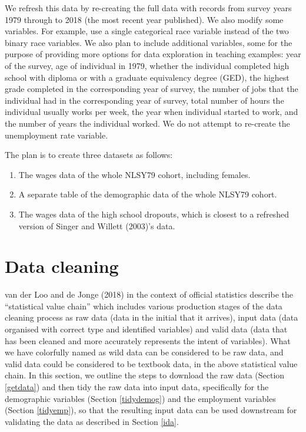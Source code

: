 \documentclass{article}
\begin{document}
We refresh this data by re-creating the full data with records from survey years 1979 through to 2018 (the most recent year published). We also modify some variables. For example, use a single categorical race variable instead of the two binary race variables. We also plan to include additional variables, some for the purpose of providing more options for data exploration in teaching examples: year of the survey, age of individual in 1979, whether the individual completed high school with diploma or with a graduate equivalency degree (GED), the highest grade completed in the corresponding year of survey, the number of jobs that the individual had in the corresponding year of survey, total number of hours the individual usually works per week, the year when individual started to work, and the number of years the individual worked. We do not attempt to re-create the unemployment rate variable.

The plan is to create three datasets as follows:

\begin{enumerate}
\def\labelenumi{\arabic{enumi}.}
\tightlist
\item
  The wages data of the whole NLSY79 cohort, including females.
\item
  A separate table of the demographic data of the whole NLSY79 cohort.
\item
  The wages data of the high school dropouts, which is closest to a refreshed version of Singer and Willett (2003)'s data.
\end{enumerate}

\hypertarget{cleaning}{%
\section{Data cleaning}\label{cleaning}}

van der Loo and de Jonge (2018) in the context of official statistics describe the ``statistical value chain'' which includes various production stages of the data cleaning process as raw data (data in the initial that it arrives), input data (data organised with correct type and identified variables) and valid data (data that has been cleaned and more accurately represents the intent of variables). What we have colorfully named as wild data can be considered to be raw data, and valid data could be considered to be textbook data, in the above statistical value chain. In this section, we outline the steps to download the raw data (Section \ref{getdata}) and then tidy the raw data into input data, specifically for the demographic variables (Section \ref{tidydemog}) and the employment variables (Section \ref{tidyemp}), so that the resulting input data can be used downstream for validating the data as described in Section \ref{ida}.
\end{document}
